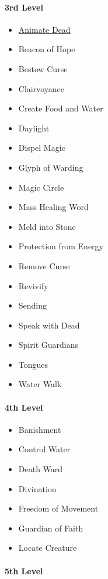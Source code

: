 \paragraph{3rd Level}\label{Cleric_Spells_3rd-level}

\begin{itemize}
\item
  \hyperref[Spell_Animate_Dead_animate-dead]{Animate Dead}
\item
  Beacon of Hope
\item
  Bestow Curse
\item
  Clairvoyance
\item
  Create Food and Water
\item
  Daylight
\item
  Dispel Magic
\item
  Glyph of Warding
\item
  Magic Circle
\item
  Mass Healing Word
\item
  Meld into Stone
\item
  Protection from Energy
\item
  Remove Curse
\item
  Revivify
\item
  Sending
\item
  Speak with Dead
\item
  Spirit Guardians
\item
  Tongues
\item
  Water Walk
\end{itemize}

\paragraph{4th Level}\label{Cleric_Spells_4th-level}

\begin{itemize}
\item
  Banishment
\item
  Control Water
\item
  Death Ward
\item
  Divination
\item
  Freedom of Movement
\item
  Guardian of Faith
\item
  Locate Creature
\end{itemize}

\paragraph{5th Level}\label{Cleric_Spells_5th-level}

